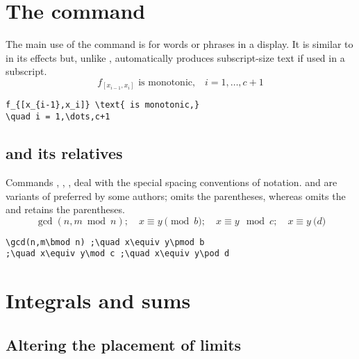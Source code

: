 \section{The  command}

The main use of the command  is for words or phrases in a display. It is similar to  in its
effects but, unlike , automatically produces subscript-size
text if used in a subscript.
\begin{equation}
f_{[x_{i-1},x_i]} \text{ is monotonic,}
\quad i = 1,\dots,c+1
\end{equation}
\begin{verbatim}
f_{[x_{i-1},x_i]} \text{ is monotonic,}
\quad i = 1,\dots,c+1
\end{verbatim}

\subsection{ and its relatives}

Commands , , ,  deal with the special
spacing conventions of  notation.  and  are
variants of  preferred by some authors;  omits the
parentheses, whereas  omits the  and retains the
parentheses.
\begin{equation}
\gcd(n,m\bmod n) ;\quad x\equiv y\pmod b
;\quad x\equiv y\mod c ;\quad x\equiv y\pod d
\end{equation}
\begin{verbatim}
\gcd(n,m\bmod n) ;\quad x\equiv y\pmod b
;\quad x\equiv y\mod c ;\quad x\equiv y\pod d
\end{verbatim}


\section{Integrals and sums}

\subsection{Altering the placement of limits}

